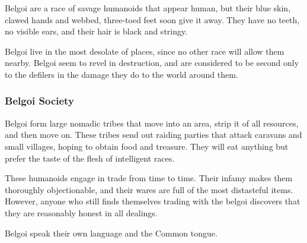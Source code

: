 Belgoi are a race of savage humanoids that appear human, but their blue skin, clawed hands and webbed, three-toed feet soon give it away. They have no teeth, no visible ears, and their hair is black and stringy.

Belgoi live in the most desolate of places, since no other race will allow them nearby. Belgoi seem to revel in destruction, and are considered to be second only to the defilers in the damage they do to the world around them.

\subsubsection{Belgoi Society}
Belgoi form large nomadic tribes that move into an area, strip it of all resources, and then move on. These tribes send out raiding parties that attack caravans and small villages, hoping to obtain food and treasure. They will eat anything but prefer the taste of the flesh of intelligent races.

These humanoids engage in trade from time to time. Their infamy makes them thoroughly objectionable, and their wares are full of the most distasteful items. However, anyone who still finds themselves trading with the belgoi discovers that they are reasonably honest in all dealings.

Belgoi speak their own language and the Common tongue.


